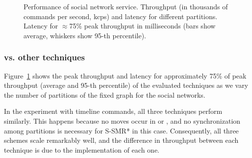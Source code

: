 \begin{figure}[ht!]
\begin{subfigure}{.4\textwidth}
    \caption{}
  \end{subfigure}
  \caption{Performance of social network service. Throughput (in thousands of commands per second, kcps) and latency for different partitions.
  Latency for $\approx$75\% peak throughput in milliseconds (bars show average, whiskers show 95-th percentile).}
  \label{fig:socialscalability}
\end{figure}

\subsubsection{\dynastar vs. other techniques}
\label{sec:dynastar-evaluation:results}

Figure~\ref{fig:socialscalability} shows the peak throughput and latency for approximately 75\% of peak throughput
 (average and 95-th percentile) of the evaluated techniques as we vary the number of
 partitions of the fixed graph for the social networks.

In the experiment with timeline commands, all three techniques perform similarly. This happens because no moves occur in
\dynastar or \dssmr{}, and no synchronization among partitions is necessary for S-SMR* in this case.
Consequently, all three schemes scale remarkably well, and
the difference in throughput between each technique is due to the implementation of each one.



